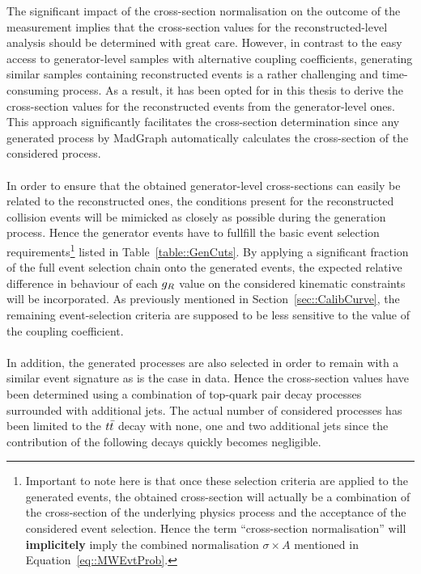 The significant impact of the cross-section normalisation on the outcome of the measurement implies that the cross-section values for the reconstructed-level analysis should be determined with great care.
However, in contrast to the easy access to generator-level samples with alternative coupling coefficients, generating similar samples containing reconstructed events is a rather challenging and time-consuming process.
As a result, it has been opted for in this thesis to derive the cross-section values for the reconstructed events from the generator-level ones.
This approach significantly facilitates the cross-section determination since any generated process by MadGraph automatically calculates the cross-section of the considered process.
\\
\\
In order to ensure that the obtained generator-level cross-sections can easily be related to the reconstructed ones, the conditions present for the reconstructed collision events will be mimicked as closely as possible during the generation process. Hence the generator events have to fullfill the basic event selection requirements\footnote{Important to note here is that once these selection criteria are applied to the generated events, the obtained cross-section will actually be a combination of the cross-section of the underlying physics process and the acceptance of the considered event selection. Hence the term ``cross-section normalisation'' will \textbf{implicitely} imply the combined normalisation $\sigma \times A$ mentioned in Equation~\ref{eq::MWEvtProb}.} listed in Table~\ref{table::GenCuts}.
By applying a significant fraction of the full event selection chain onto the generated events, the expected relative difference in behaviour of each $g_{R}$ value on the considered kinematic constraints will be incorporated. As previously mentioned in Section~\ref{sec::CalibCurve}, the remaining event-selection criteria are supposed to be less sensitive to the value of the coupling coefficient.
\\
\\
In addition, the generated processes are also selected in order to remain with a similar event signature as is the case in data. Hence the cross-section values have been determined using a combination of top-quark pair decay processes surrounded with additional jets. The actual number of considered processes has been limited to the $t\bar{t}$ decay with none, one and two additional jets since the contribution of the following decays quickly becomes negligible.
